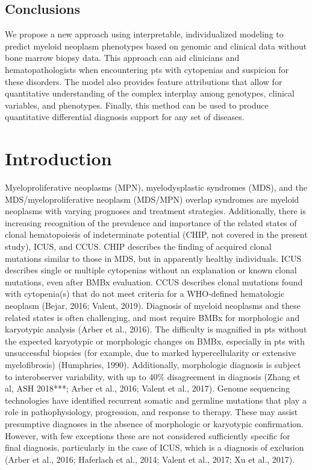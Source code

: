 \documentclass[
]{article}
\begin{document}
\hypertarget{conclusions}{%
\subsection{Conclusions}\label{conclusions}}

We propose a new approach using interpretable, individualized modeling
to predict myeloid neoplasm phenotypes based on genomic and clinical
data without bone marrow biopsy data. This approach can aid clinicians
and hematopathologists when encountering pts with cytopenias and
suspicion for these disorders. The model also provides feature
attributions that allow for quantitative understanding of the complex
interplay among genotypes, clinical variables, and phenotypes. Finally,
this method can be used to produce quantitative differential diagnosis
support for any set of diseases.

\hypertarget{introduction}{%
\section{Introduction}\label{introduction}}

Myeloproliferative neoplasms (MPN), myelodysplastic syndromes (MDS), and
the MDS/myeloproliferative neoplasm (MDS/MPN) overlap syndromes are
myeloid neoplasms with varying prognoses and treatment strategies.
Additionally, there is increasing recognition of the prevalence and
importance of the related states of clonal hematopoiesis of
indeterminate potential (CHIP, not covered in the present study), ICUS,
and CCUS. CHIP describes the finding of acquired clonal mutations
similar to those in MDS, but in apparently healthy individuals. ICUS
describes single or multiple cytopenias without an explanation or known
clonal mutations, even after BMBx evaluation. CCUS describes clonal
mutations found with cytopenia(s) that do not meet criteria for a
WHO-defined hematologic neoplasm (Bejar, 2016; Valent, 2019). Diagnosis
of myeloid neoplasms and these related states is often challenging, and
most require BMBx for morphologic and karyotypic analysis (Arber et al.,
2016). The difficulty is magnified in pts without the expected
karyotypic or morphologic changes on BMBx, especially in pts with
unsuccessful biopsies (for example, due to marked hypercellularity or
extensive myelofibrosis) (Humphries, 1990). Additionally, morphologic
diagnosis is subject to interobserver variability, with up to 40\%
disagreement in diagnosis (Zhang et al, ASH 2018***; Arber et al., 2016;
Valent et al., 2017). Genome sequencing technologies have identified
recurrent somatic and germline mutations that play a role in
pathophysiology, progression, and response to therapy. These may assist
presumptive diagnoses in the absence of morphologic or karyotypic
confirmation. However, with few exceptions these are not considered
sufficiently specific for final diagnosis, particularly in the case of
ICUS, which is a diagnosis of exclusion (Arber et al., 2016; Haferlach
et al., 2014; Valent et al., 2017; Xu et al., 2017).
\end{document}
